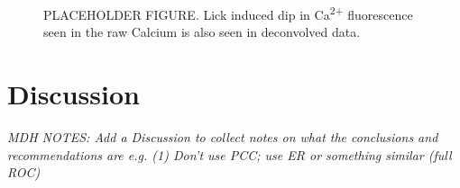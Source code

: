 \documentclass[a4paper]{article}
\begin{document}
\begin{figure}[h!]
\centering
\caption{\label{fig:lick_PSTH} PLACEHOLDER FIGURE. Lick induced dip in Ca\textsuperscript{2+} fluorescence seen in the raw Calcium is also seen in deconvolved data.}
\end{figure}









\section{Discussion}
\emph{MDH NOTES: Add a Discussion to collect notes on what the conclusions and recommendations are e.g.
(1) Don’t use PCC; use ER or something similar (full ROC)}
\end{document}
